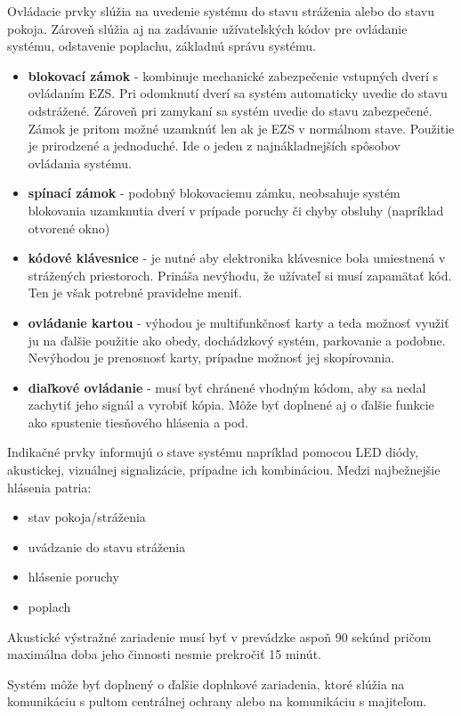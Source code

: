 Ovládacie prvky slúžia na uvedenie systému do stavu stráženia alebo do stavu pokoja. Zároveň slúžia aj na zadávanie užívateľských kódov pre ovládanie systému, odstavenie poplachu, základnú správu systému.
\begin{itemize}
    \item \textbf{blokovací zámok} - kombinuje mechanické zabezpečenie vstupných dverí s ovládaním EZS. Pri odomknutí dverí sa systém automaticky uvedie do stavu odstrážené. Zároveň pri zamykaní sa systém uvedie do stavu zabezpečené. Zámok je pritom možné uzamknúť len ak je EZS v normálnom stave. Použitie je prirodzené a jednoduché. Ide o jeden z najnákladnejších spôsobov ovládania systému.
    \item \textbf{spínací zámok} - podobný blokovaciemu zámku, neobsahuje systém blokovania uzamknutia dverí v prípade poruchy či chyby obsluhy (napríklad otvorené okno)
    \item \textbf{kódové klávesnice} - je nutné aby elektronika klávesnice bola umiestnená v strážených priestoroch. Prináša nevýhodu, že užívateľ si musí zapamätať kód. Ten je však potrebné pravidelne meniť.
    \item \textbf{ovládanie kartou} - výhodou je multifunkčnosť karty a teda možnosť využiť ju na ďalšie použitie ako obedy, dochádzkový systém, parkovanie a podobne. Nevýhodou je prenosnosť karty, prípadne možnosť jej skopírovania.
    \item \textbf{diaľkové ovládanie} - musí byť chránené vhodným kódom, aby sa nedal zachytiť jeho signál a vyrobiť kópia. Môže byť doplnené aj o ďalšie funkcie ako spustenie tiesňového hlásenia a pod.\cite{velas_ezs}
\end{itemize}

Indikačné prvky informujú o stave systému napríklad pomocou LED diódy, akustickej, vizuálnej signalizácie, prípadne ich kombináciou. Medzi najbežnejšie hlásenia patria:
\begin{itemize}
    \item stav pokoja/stráženia
    \item uvádzanie do stavu stráženia
    \item hlásenie poruchy
    \item poplach
\end{itemize}

Akustické výstražné zariadenie musí byť v prevádzke aspoň 90 sekúnd pričom maximálna doba jeho činnosti nesmie prekročiť 15 minút.\cite{csn-en-50131-1}

Systém môže byť doplnený o ďalšie doplnkové zariadenia, ktoré slúžia na komunikáciu s pultom centrálnej ochrany alebo na komunikáciu s majiteľom.\cite{Krecek}

